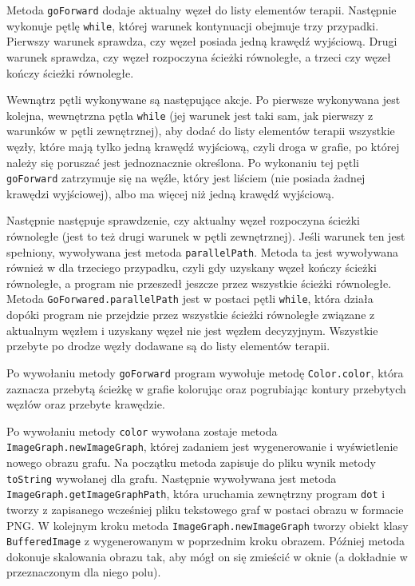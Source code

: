 Metoda \texttt{goForward} dodaje aktualny węzeł do listy elementów terapii. Następnie wykonuje pętlę \texttt{while}, której warunek kontynuacji obejmuje trzy przypadki. Pierwszy warunek sprawdza, czy węzeł posiada jedną krawędź wyjściową. Drugi warunek sprawdza, czy węzeł rozpoczyna ścieżki równoległe, a trzeci czy węzeł kończy ścieżki równoległe. 

Wewnątrz pętli wykonywane są następujące akcje. Po pierwsze wykonywana jest kolejna, wewnętrzna pętla \texttt{while} (jej warunek jest taki sam, jak pierwszy z warunków w pętli zewnętrznej), aby dodać do listy elementów terapii wszystkie węzły, które mają tylko jedną krawędź wyjściową, czyli droga w grafie, po której należy się poruszać jest jednoznacznie określona. Po wykonaniu tej pętli \texttt{goForward} zatrzymuje się na węźle, który jest liściem (nie posiada żadnej krawędzi wyjściowej), albo ma więcej niż jedną krawędź wyjściową.

Następnie następuje sprawdzenie, czy aktualny węzeł rozpoczyna ścieżki równoległe (jest to też drugi warunek w pętli zewnętrznej). Jeśli warunek ten jest spełniony, wywoływana jest metoda \texttt{parallel\-Path}. Metoda ta jest wywoływana również w dla trzeciego przypadku, czyli gdy uzyskany węzeł kończy ścieżki równoległe, a program nie przeszedł jeszcze przez wszystkie ścieżki równoległe. Metoda \texttt{GoForwared.parallel\-Path} jest w postaci pętli \texttt{while}, która działa dopóki program nie przejdzie przez wszystkie ścieżki równoległe związane z aktualnym węzłem i uzyskany węzeł nie jest węzłem decyzyjnym. Wszystkie przebyte po drodze węzły dodawane są do listy elementów terapii.  

Po wywołaniu metody \texttt{goForward} program wywołuje metodę \texttt{Color.color}, która zaznacza przebytą ścieżkę w grafie kolorując oraz pogrubiając kontury przebytych węzłów oraz przebyte krawędzie.
 
Po wywołaniu metody \texttt{color} wywołana zostaje metoda \texttt{ImageGraph.newImageGraph}, której zadaniem jest wygenerowanie i wyświetlenie nowego obrazu grafu. Na początku metoda zapisuje do pliku wynik metody \texttt{toString} wywołanej dla grafu. Następnie wywoływana jest metoda \texttt{ImageGraph.getImageGraphPath}, która uruchamia zewnętrzny program \texttt{dot} i tworzy z zapisanego wcześniej pliku tekstowego graf w postaci obrazu w formacie PNG. W kolejnym kroku metoda \texttt{ImageGraph.newImageGraph} tworzy obiekt klasy \texttt{BufferedImage} z wygenerowanym w poprzednim kroku obrazem. Później metoda dokonuje skalowania obrazu tak, aby mógł on się zmieścić w oknie (a dokładnie w przeznaczonym dla niego polu). 

